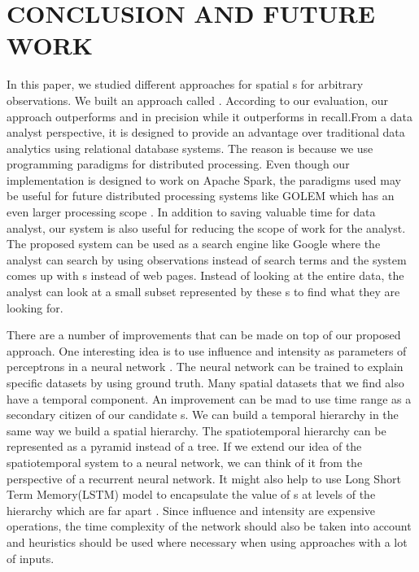 \section{CONCLUSION AND FUTURE WORK}
\label{chp:concl}
In this paper, we studied different approaches for spatial {\explanation}s for arbitrary observations. We built an approach called {\solution}. According to our evaluation, our approach outperforms {\aggravation} and {\intervention} in precision while it outperforms {\aggravation} in recall.From a data analyst perspective, it is designed to provide an advantage over traditional data analytics using relational database systems. The reason is because we use programming paradigms for distributed processing. Even though our implementation is designed to work on Apache Spark, the paradigms used may be useful for future distributed processing systems like GOLEM which has an even larger processing scope \cite{golem2018}. In addition to saving valuable time for data analyst, our system is also useful for reducing the scope of work for the analyst. The proposed system can be used as a search engine like Google where the analyst can search by using observations instead of search terms and the system comes up with {\explanation}s instead of web pages. Instead of looking at the entire data, the analyst can look at a small subset represented by these {\explanation}s to find what they are looking for.

There are a number of improvements that can be made on top of our proposed approach. One interesting idea is to use influence and intensity as parameters of perceptrons in a neural network \cite{grossberg1988nonlinear,widrow199030}. The neural network can be trained to explain specific datasets by using ground truth.
Many spatial datasets that we find also have a temporal component. An improvement can be mad to use time range as a secondary citizen of our candidate {\explanation}s. We can build a temporal hierarchy in the same way we build a spatial hierarchy. The spatiotemporal hierarchy can be represented as a pyramid instead of a tree.
If we extend our idea of the spatiotemporal system to a neural network, we can think of it from the perspective of a recurrent neural network\cite{chung2016hierarchical}. It might also help to use Long Short Term Memory(LSTM) model to encapsulate the value of {\explanation}s at levels of the hierarchy which are far apart \cite{hochreiter1997long}.
Since influence and intensity are expensive operations, the time complexity of the network should also be taken into account and heuristics should be used where necessary when using approaches with a lot of inputs.

